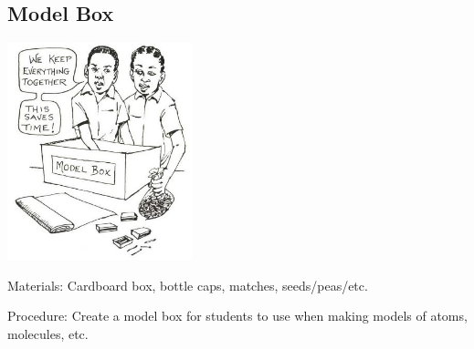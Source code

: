 \begin{multicols}{2}
\vfill
\columnbreak

\subsection{Model Box} 

\begin{center}
\includegraphics[width=0.4\textwidth]{./img/source/model-box.jpg}
\end{center}

\begin{description*}
\item[Materials:]{Cardboard box, bottle caps, matches, seeds/peas/etc.}
\item[Procedure:]{Create a model box for students to use when making models of atoms, molecules, etc.}
\end{description*}


\end{multicols}


\pagebreak